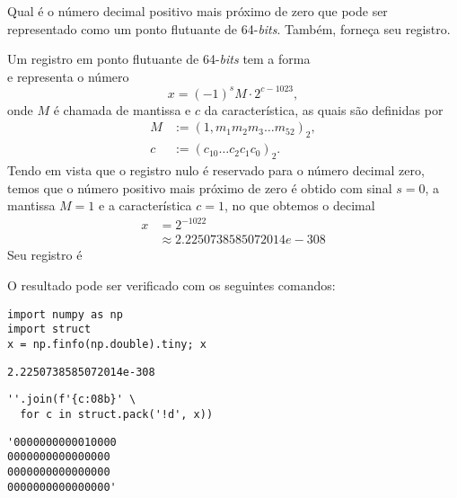 \begin{exeresol}
  Qual é o número decimal positivo mais próximo de zero que pode ser representado como um ponto flutuante de 64-{\it bits}. Também, forneça seu registro.
\end{exeresol}
\begin{resol}
  Um registro em ponto flutuante de 64-{\it bits} tem a forma
  \begin{equation}
    [s ~ | ~ c_{10} ~ c_9 ~ \ldots ~ c_{0} ~ | ~ m_1 ~ m_2 ~ \ldots ~ m_{52}]
  \end{equation}
  e representa o número
  \begin{equation}
    x = (-1)^s M\cdot 2^{c - 1023},
  \end{equation}
  onde $M$ é chamada de mantissa e $c$ da característica, as quais são definidas por
  \begin{align}
    M &:= (1,m_1m_2m_3\ldots m_{52})_2,\\
    c &:= (c_{10}\ldots c_2c_1c_0)_2.
  \end{align}
  Tendo em vista que o registro nulo é reservado para o número decimal zero, temos que o número positivo mais próximo de zero é obtido com sinal $s=0$, a mantissa $M=1$ e a característica $c=1$, no que obtemos o decimal
  \begin{align}
    x &= 2^{-1022}\\
      &\approx 2.2250738585072014e-308
  \end{align}
  Seu registro é
  \begin{equation}
    [0 ~ | ~ 0 ~ 0 ~ \ldots ~ 1 ~ | ~ 0 ~ 0 ~ \ldots ~ 0]
  \end{equation}

  O resultado pode ser verificado com os seguintes comandos:

\begin{lstlisting}
import numpy as np
import struct
x = np.finfo(np.double).tiny; x
\end{lstlisting}

\begin{verbatim}
2.2250738585072014e-308
\end{verbatim}

\begin{lstlisting}
''.join(f'{c:08b}' \
  for c in struct.pack('!d', x))
\end{lstlisting}

\begin{verbatim}
'0000000000010000
0000000000000000
0000000000000000
0000000000000000'
\end{verbatim}

\end{resol}

